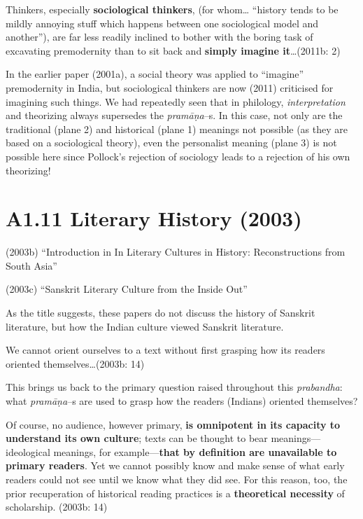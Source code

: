\newpage

\begin{myquote}
Thinkers, especially \textbf{sociological thinkers}, (for whom… “history tends to be mildly annoying stuff which happens between one sociological model and another”), are far less readily inclined to bother with the boring task of excavating premodernity than to sit back and \textbf{simply imagine it}…(2011b: 2)
\end{myquote}

In the earlier paper (2001a), a social theory was applied to “imagine” premodernity in India, but sociological thinkers are now (2011) criticised for imagining such things. We had repeatedly seen that in philology, \textit{interpretation} and theorizing always supersedes the \textit{pramāṇa}–s. In this case, not only are the traditional (plane 2) and historical (plane 1) meanings not possible (as they are based on a sociological theory), even the personalist meaning (plane 3) is not possible here since Pollock’s rejection of sociology leads to a rejection of his own theorizing!

\vspace {-.4cm}

\section*{A1.11 Literary History (2003)}

(2003b) “Introduction in In Literary Cultures in History: Reconstructions from South Asia”

(2003c) “Sanskrit Literary Culture from the Inside Out”

As the title suggests, these papers do not discuss the history of Sanskrit literature, but how the Indian culture viewed Sanskrit literature.

\begin{myquote}
We cannot orient ourselves to a text without ﬁrst grasping how its readers oriented themselves…(2003b: 14)
\end{myquote}

This brings us back to the primary question raised throughout this \textit{prabandha}: what \textit{pramāṇa}–s are used to grasp how the readers (Indians) oriented themselves?

\begin{myquote}
Of course, no audience, however primary, \textbf{is omnipotent in its capacity to understand its own culture}; texts can be thought to bear meanings—ideological meanings, for example—\textbf{that by deﬁnition are unavailable to primary readers}. Yet we cannot possibly know and make sense of what early readers could not see until we know what they did see. For this reason, too, the prior recuperation of historical reading practices is a \textbf{theoretical necessity} of scholarship. (2003b: 14)
\end{myquote}

